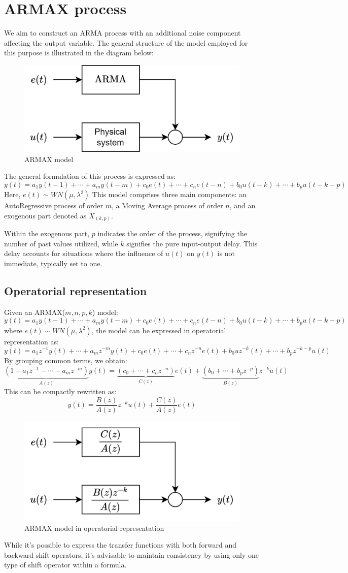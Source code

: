 \section{ARMAX process}

We aim to construct an ARMA process with an additional noise component affecting the output variable. 
The general structure of the model employed for this purpose is illustrated in the diagram below:
\begin{figure}[H]
    \centering
    \includegraphics[width=0.5\linewidth]{images/armax.png}
    \caption{ARMAX model}
\end{figure}
The general formulation of this process is expressed as:
\[y(t)=a_1y(t-1)+\cdots+a_m y(t-m)+c_0e(t)+\cdots+c_n e(t-n)+b_0u(t-k)+\cdots+b_p u(t-k-p)\] 
Here, $e(t)\sim WN(\mu,\lambda^2)$
This model comprises three main components: an AutoRegressive process of order $m$, a Moving Average process of order $n$, and an exogenous part denoted as $X_{(k,p)}$.

Within the exogenous part, $p$ indicates the order of the process, signifying the number of past values utilized, while $k$ signifies the pure input-output delay. 
This delay accounts for situations where the influence of $u(t)$ on $y(t)$ is not immediate, typically set to one.

\subsection{Operatorial representation}
Given an ARMAX($m,n,p,k$) model:
\[y(t)=a_1y(t-1)+\cdots+a_m y(t-m)+c_0e(t)+\cdots+c_n e(t-n)+b_0u(t-k)+\cdots+b_p u(t-k-p)\] 
where $e(t)\sim WN(\mu,\lambda^2)$, the model can be expressed in operatorial representation as:
\[y(t)=a_1z^{-1}y(t)+\cdots+a_m z^{-m}y(t)+c_0e(t)+\cdots+c_n z^{-n}e(t)+b_0uz^{-k}(t)+\cdots+b_p z^{-k-p}u(t)\]
By grouping common terms, we obtain:
\[\underbrace{\left(1-a_1z^{-1}-\cdots-a_m z^{-m}\right)}_{A(z)} y(t)=\underbrace{\left(c_0+\cdots+c_n z^{-n}\right)}_{C(z)} e(t)+\underbrace{\left(b_0+\cdots+b_p z^{-p}\right)}_{B(z)} z^{-k}u(t)\]
This can be compactly rewritten as:
\[y(t)=\dfrac{B(z)}{A(z)}z^{-k}u(t)+\dfrac{C(z)}{A(z)}e(t)\]
\begin{figure}[H]
    \centering
    \includegraphics[width=0.5\linewidth]{images/armaxblock.png}
    \caption{ARMAX model in operatorial representation}
\end{figure}
While it's possible to express the transfer functions with both forward and backward shift operators, it's advisable to maintain consistency by using only one type of shift operator within a formula.